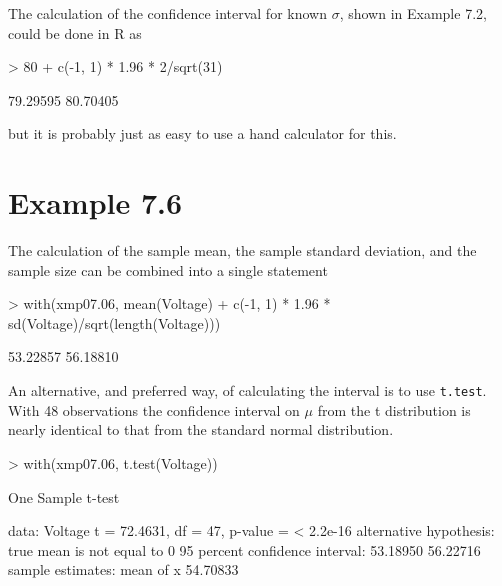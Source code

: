 \documentclass{book}
\begin{document}
The calculation of the confidence interval for known $\sigma$, shown in
Example 7.2, could be done in R as
\begin{Schunk}
\begin{Sinput}
> 80 + c(-1, 1) * 1.96 * 2/sqrt(31)
\end{Sinput}
\begin{Soutput}
[1] 79.29595 80.70405
\end{Soutput}
\end{Schunk}
but it is probably just as easy to use a hand calculator for this.


\section{Example 7.6}
\label{sec:xmp07.06}

The calculation of the sample mean, the sample standard deviation, and
the sample size can be combined into a single statement
\begin{Schunk}
\begin{Sinput}
> with(xmp07.06, mean(Voltage) + c(-1, 1) * 1.96 * sd(Voltage)/sqrt(length(Voltage)))
\end{Sinput}
\begin{Soutput}
[1] 53.22857 56.18810
\end{Soutput}
\end{Schunk}
An alternative, and preferred way, of calculating the interval is to
use \texttt{t.test}.  With 48 observations the confidence interval on
$\mu$ from the t distribution is nearly identical to that from the
standard normal distribution.
\begin{Schunk}
\begin{Sinput}
> with(xmp07.06, t.test(Voltage))
\end{Sinput}
\begin{Soutput}
	One Sample t-test

data:  Voltage 
t = 72.4631, df = 47, p-value = < 2.2e-16
alternative hypothesis: true mean is not equal to 0 
95 percent confidence interval:
 53.18950 56.22716 
sample estimates:
mean of x 
 54.70833 
\end{Soutput}
\end{Schunk}
\end{document}
